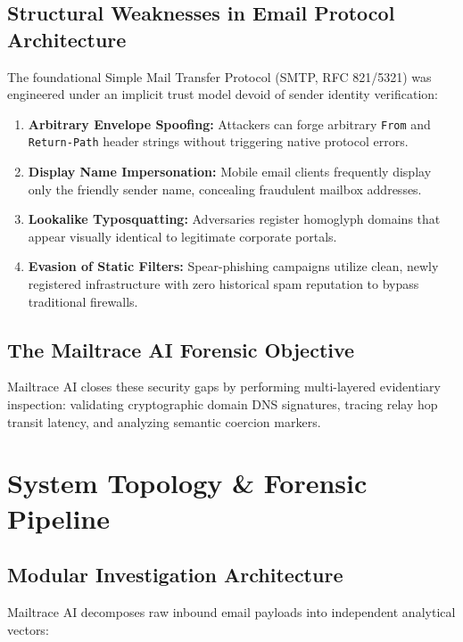 \documentclass[12pt,a4paper]{report}
\begin{document}
\section{Structural Weaknesses in Email Protocol Architecture}
The foundational Simple Mail Transfer Protocol (SMTP, RFC 821/5321) was engineered under an implicit trust model devoid of sender identity verification:
\begin{enumerate}[nosep]
    \item \textbf{Arbitrary Envelope Spoofing:} Attackers can forge arbitrary \texttt{From} and \texttt{Return-Path} header strings without triggering native protocol errors.
    \item \textbf{Display Name Impersonation:} Mobile email clients frequently display only the friendly sender name, concealing fraudulent mailbox addresses.
    \item \textbf{Lookalike Typosquatting:} Adversaries register homoglyph domains that appear visually identical to legitimate corporate portals.
    \item \textbf{Evasion of Static Filters:} Spear-phishing campaigns utilize clean, newly registered infrastructure with zero historical spam reputation to bypass traditional firewalls.
\end{enumerate}

\section{The Mailtrace AI Forensic Objective}
Mailtrace AI closes these security gaps by performing multi-layered evidentiary inspection: validating cryptographic domain DNS signatures, tracing relay hop transit latency, and analyzing semantic coercion markers.

\chapter{System Topology \& Forensic Pipeline}

\section{Modular Investigation Architecture}
Mailtrace AI decomposes raw inbound email payloads into independent analytical vectors:
\end{document}
